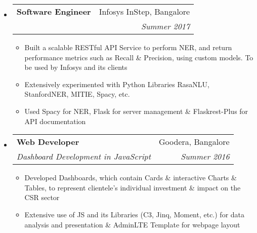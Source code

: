 \documentclass[letterpaper,11pt]{article}
\makeatletter
\newcommand{\MYhref}[3][blue]{\href{#2}{\color{#1}{#3}}}%
\newcommand{\ressubheading}[4]{
\begin{tabular*}{6.5in}{l@{\extracolsep{\fill}}r}
    \textbf{#1} & #2 \\
    \textit{#3} & \textit{#4} \\
\end{tabular*}\vspace{-6pt}}
\makeatother
\begin{document}
\begin{itemize}

\item
\ressubheading{Software Engineer}{Infosys InStep, Bangalore}{\MYhref[black]{https://drive.google.com/open?id=0Bz73jm6QnK_sZ0Y4VmdqNnlha2c}{REST Framework for Named Entity Extraction}}{Summer 2017}
\begin{itemize}
\item Built a scalable RESTful API Service to perform NER, and return performance metrics such as Recall \& Precision, using custom models. To be used by Infosys and its clients
\item Extensively experimented with Python Libraries RasaNLU, StanfordNER, MITIE, Spacy, etc.
\item Used Spacy for NER, Flask for server management \& Flaskrest-Plus for API documentation
\end{itemize}

\item
\ressubheading{Web Developer}{Goodera, Bangalore}{Dashboard Development in JavaScript}{Summer 2016}
\begin{itemize}
\item Developed Dashboards, which contain Cards \& interactive Charts \& Tables, to represent clientele's individual investment \& impact on the CSR sector
\item Extensive use of JS and its Libraries (C3, Jinq, Moment, etc.) for data analysis and presentation \& AdminLTE Template for webpage layout
\end{itemize}

\end{itemize}
\end{document}
